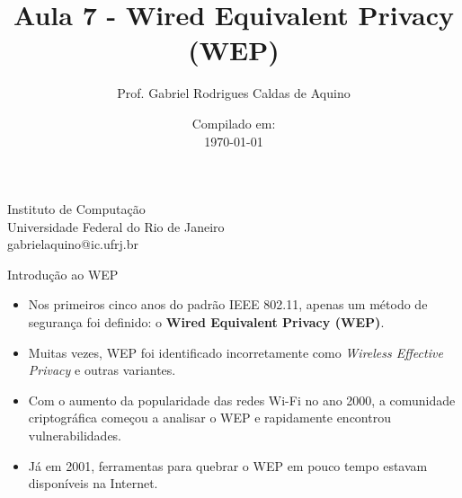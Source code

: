 \title{Aula 7 - Wired Equivalent Privacy (WEP)}

\author{Prof. Gabriel Rodrigues Caldas de Aquino}

\institute
{
    Instituto de Computação \\
    Universidade Federal do Rio de Janeiro\\
    gabrielaquino@ic.ufrj.br%
}
\date{Compilado em: \\ \today} %




\begin{frame}
    \titlepage
\end{frame}


\begin{frame}{Introdução ao WEP}
\begin{itemize}
    \item Nos primeiros cinco anos do padrão IEEE 802.11, apenas um método de segurança foi definido: o \textbf{Wired Equivalent Privacy (WEP)}.
    \item Muitas vezes, WEP foi identificado incorretamente como \textit{Wireless Effective Privacy} e outras variantes.
    \item Com o aumento da popularidade das redes Wi-Fi no ano 2000, a comunidade criptográfica começou a analisar o WEP e rapidamente encontrou vulnerabilidades.
    \item Já em 2001, ferramentas para quebrar o WEP em pouco tempo estavam disponíveis na Internet.
\end{itemize}
\end{frame}


